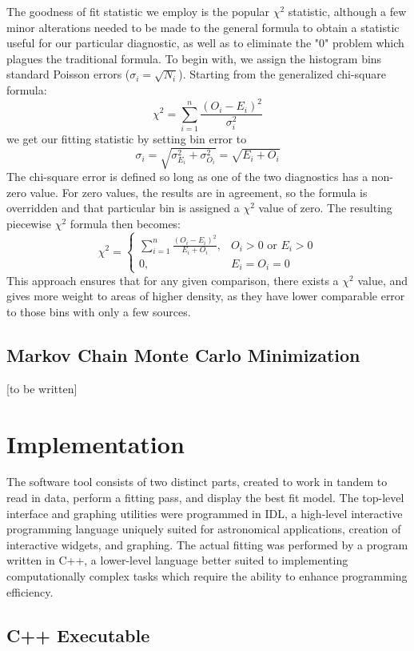 \documentclass[twocolumn,letterpaper,10pt]{article}
\begin{document}
The goodness of fit statistic we employ is the popular $\chi^2$ statistic, although a few minor alterations needed to be made to the general formula to obtain a statistic useful for our particular diagnostic, as well as to eliminate the "0" problem which plagues the traditional formula. To begin with, we assign the histogram bins standard Poisson errors ($\sigma_i=\sqrt{N_i}$). Starting from the generalized chi-square formula:
$$
\chi^2=\sum\limits_{i=1}^n \frac{(O_i-E_i)^2}{\sigma_i^2}
$$
we get our fitting statistic by setting bin error to 
$$
\sigma_i=\sqrt{\sigma_{E_i}^2+\sigma_{O_i}^2}=\sqrt{E_i+O_i}
$$ 
The chi-square error is defined so long as one of the two diagnostics has a non-zero value. For zero values, the results are in agreement, so the formula is overridden and that particular bin is assigned a $\chi^2$ value of zero. The resulting piecewise $\chi^2$ formula then becomes:
$$
\chi^2=
\begin{cases}
\sum\limits_{i=1}^n \frac{(O_i-E_i)^2}{E_i+O_i}, & O_i > 0 \text{ or } E_i > 0 \\
0, & E_i=O_i=0
\end{cases}
$$
This approach ensures that for any given comparison, there exists a $\chi^2$ value, and gives more weight to areas of higher density, as they have lower comparable error to those bins with only a few sources.

\subsection{Markov Chain Monte Carlo Minimization}

[to be written]

\section{Implementation}

The software tool consists of two distinct parts, created to work in tandem to read in data, perform a fitting pass, and display the best fit model. The top-level interface and graphing utilities were programmed in IDL, a high-level interactive programming language uniquely suited for astronomical applications, creation of interactive widgets, and graphing. The actual fitting was performed by a program written in C++, a lower-level language better suited to implementing computationally complex tasks which require the ability to enhance programming efficiency.

\subsection{C++ Executable}
\end{document}

